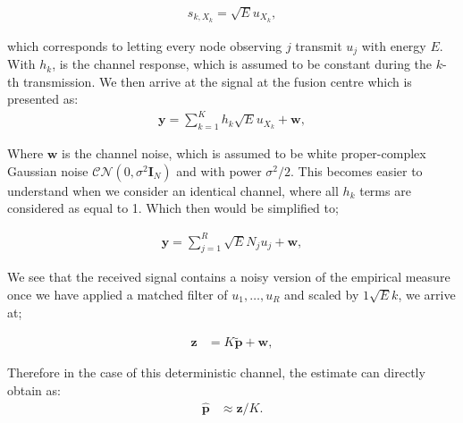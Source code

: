 \documentclass{article}
\begin{document}
\begin{align}
    s_{k,X_k} = \sqrt{E}u_{X_k}, 
\end{align}

which corresponds to letting every node observing $j$ transmit $u_j$ with energy $E$. With $h_k$, is the channel response, which is assumed to be constant during the $k$-th transmission.  We then arrive at the signal at the fusion centre which is presented as:
\begin{align}
    \boldsymbol{y} = \sum_{k=1}^K h_k  \sqrt{E}u_{X_k} + \boldsymbol{w}, \label{eq:system_model}
\end{align}

Where $\boldsymbol{w}$ is the channel noise, which is assumed to be white proper-complex Gaussian noise $\mathcal{CN}(0, \sigma^2 \boldsymbol{I}_N)$ and with power $\sigma^2/2$.  This becomes easier to understand when we consider an identical channel, where all $h_k$ terms are considered as equal to 1. Which then would be simplified to;

\begin{align}
    \boldsymbol{y} = \sum_{j=1}^R \sqrt{E}N_j u_{j} + \boldsymbol{w}, \label{eq:simplified_system_model}
\end{align}


We see that the received signal contains a noisy version of the empirical measure once we have applied a matched filter of $u_1,\dots,u_R$ and scaled by $1\sqrt{E}k$, we arrive at;

%
\begin{align}
    \boldsymbol{z} &= K \tilde{\boldsymbol{p}} + \boldsymbol{w}, 
    \label{simple_estimation_indentical}
\end{align}

Therefore in the case of this deterministic channel, the estimate can directly obtain as:
%
\begin{align}
    \boldsymbol{\hat{p}} &\approx \boldsymbol{z} / K. \label{eq:est_const_sys}
\end{align}
\end{document}
